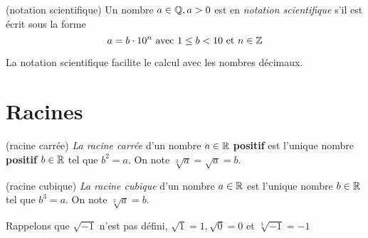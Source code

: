 \documentclass[a4paper,12pt]{report}
\begin{document}
\begin{defi}(notation scientifique)
	Un nombre $a\in \mathbb Q, a>0$ est en \emph{notation scientifique} s'il est écrit sous la forme 
	\[a=b\cdot 10^n \text{ avec } 1\leq b<10 \text{ et } n\in \mathbb Z\]
\end{defi}
\begin{technique}
	La notation scientifique facilite le calcul avec les nombres décimaux.
\end{technique}
\section{Racines}
\begin{defi}(racine carrée)
	\emph{La racine carrée} d'un nombre $a\in \mathbb R$ {\bfseries positif} est l'unique nombre {\bfseries positif} $b\in \mathbb R$ tel que $b^2=a$. On note $\sqrt[2]{a}=\sqrt{a}=b$. 
\end{defi}
\begin{defi}(racine cubique)
	\emph{La racine cubique} d'un nombre $a\in \mathbb R$ est l'unique nombre $b\in \mathbb R$ tel que $b^3=a$. On note $\sqrt[3]{a}=b$. 
\end{defi}
Rappelons que $\sqrt{-1}$ n'est pas défini, $\sqrt{1}=1, \sqrt{0}=0$ et $\sqrt[3]{-1}=-1$
\end{document}
